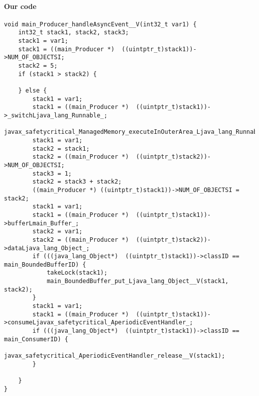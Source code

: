 \paragraph{Our code}\hfill
\begin{lstlisting}[firstnumber=1676]
void main_Producer_handleAsyncEvent__V(int32_t var1) {
	int32_t stack1, stack2, stack3;
	stack1 = var1;
	stack1 = ((main_Producer *)  ((uintptr_t)stack1))->NUM_OF_OBJECTSI;
	stack2 = 5;
	if (stack1 > stack2) {
		
	} else {
		stack1 = var1;
		stack1 = ((main_Producer *)  ((uintptr_t)stack1))->_switchLjava_lang_Runnable_;
		javax_safetycritical_ManagedMemory_executeInOuterArea_Ljava_lang_Runnable__V(stack1);
		stack1 = var1;
		stack2 = stack1;
		stack2 = ((main_Producer *)  ((uintptr_t)stack2))->NUM_OF_OBJECTSI;
		stack3 = 1;
		stack2 = stack3 + stack2;
		((main_Producer *) ((uintptr_t)stack1))->NUM_OF_OBJECTSI = stack2;
		stack1 = var1;
		stack1 = ((main_Producer *)  ((uintptr_t)stack1))->bufferLmain_Buffer_;
		stack2 = var1;
		stack2 = ((main_Producer *)  ((uintptr_t)stack2))->dataLjava_lang_Object_;
		if (((java_lang_Object*)  ((uintptr_t)stack1))->classID == main_BoundedBufferID) {
			takeLock(stack1);
			main_BoundedBuffer_put_Ljava_lang_Object__V(stack1, stack2);
		}
		stack1 = var1;
		stack1 = ((main_Producer *)  ((uintptr_t)stack1))->consumeLjavax_safetycritical_AperiodicEventHandler_;
		if (((java_lang_Object*)  ((uintptr_t)stack1))->classID == main_ConsumerID) {
			javax_safetycritical_AperiodicEventHandler_release__V(stack1);
		}

	}
}
\end{lstlisting}

